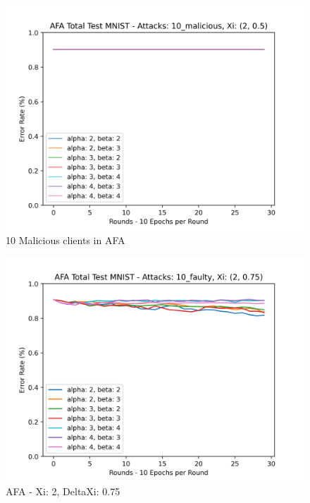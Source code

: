 \begin{figure}[htbp]
	\centering
    \includegraphics[scale=0.5]{initial/graphs/malicious_afa.png}
	\caption{10 Malicious clients in AFA}
	\label{fig:mal_afa}
\end{figure}

\begin{figure}[htbp]
	\centering
    \includegraphics[scale=0.5]{initial/graphs/afa_2_0.75.png}
	\caption{AFA - Xi: 2, DeltaXi: 0.75}
	\label{fig:afa_2_0.75}
\end{figure}

